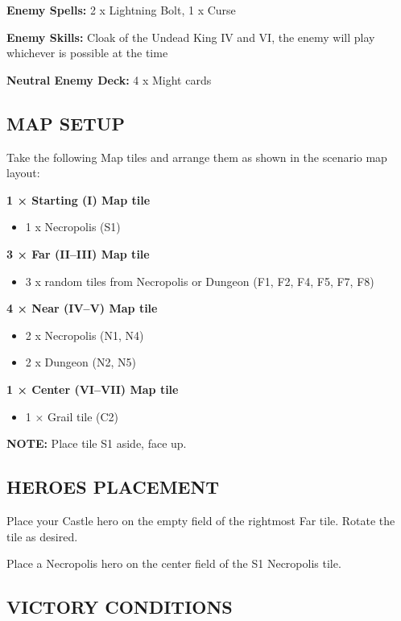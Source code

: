 \begin{multicols*}{2}
\textbf{Enemy Spells:} 2 x Lightning Bolt, 1 x Curse

\textbf{Enemy Skills:} Cloak of the Undead King IV and VI, the enemy will play whichever is possible at the time

\textbf{Neutral Enemy Deck:} 4 x Might cards

\subsection*{\MakeUppercase{Map setup}}

Take the following Map tiles and arrange them as shown in the scenario map layout:

\textbf{1 × Starting (I) Map tile}
\begin{itemize}
    \item 1 x Necropolis (S1)
\end{itemize}

\textbf{3 × Far (II--III) Map tile}
\begin{itemize}
    \item 3 x random tiles from Necropolis or Dungeon (F1, F2, F4, F5, F7, F8)
\end{itemize}

\textbf{4 × Near (IV--V) Map tile}
\begin{itemize}
    \item 2 x Necropolis (N1, N4)
    \item 2 x Dungeon (N2, N5)
\end{itemize}

\textbf{1 × Center (VI--VII) Map tile}
\begin{itemize}
  \item 1 × Grail tile (C2)
\end{itemize}

\textbf{\MakeUppercase{Note:}} Place tile S1 aside, face up.

\subsection*{\MakeUppercase{Heroes placement}}

Place your Castle hero on the empty field of the rightmost Far tile. Rotate the tile as desired.

Place a Necropolis hero on the center field of the S1 Necropolis tile.

\subsection*{\MakeUppercase{Victory Conditions}}


\end{multicols*}
